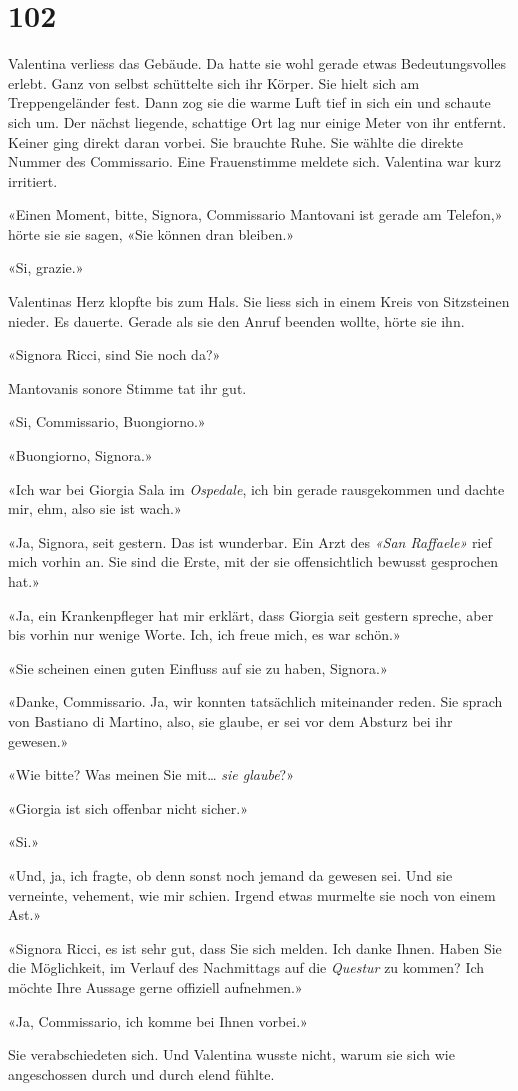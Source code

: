 \chapter{102}



Valentina verliess das Gebäude.
Da hatte sie wohl gerade etwas Bedeutungsvolles erlebt. Ganz von selbst
schüttelte sich ihr Körper. Sie hielt sich am Treppengeländer fest.
Dann zog sie die warme Luft tief in sich ein und schaute sich um. Der nächst liegende, schattige Ort 
lag nur einige Meter von ihr entfernt. Keiner ging direkt daran vorbei. Sie brauchte Ruhe.
Sie wählte die direkte Nummer des Commissario.
Eine Frauenstimme meldete sich. Valentina war kurz irritiert.

«Einen Moment, bitte, Signora, Commissario Mantovani ist gerade am
Telefon,» hörte sie sie sagen, «Sie können dran bleiben.»

«Si, grazie.»

Valentinas Herz klopfte bis zum Hals. Sie liess sich in einem Kreis von
Sitzsteinen nieder. Es dauerte.
Gerade als sie den Anruf beenden wollte, hörte sie ihn.

«Signora Ricci, sind Sie noch da?»

Mantovanis sonore Stimme tat ihr gut.

«Si, Commissario, Buongiorno.»

«Buongiorno, Signora.»

«Ich war bei Giorgia Sala im \emph{Ospedale}, ich bin gerade
rausgekommen und dachte mir, ehm, also sie ist wach.»

«Ja, Signora, seit gestern. Das ist wunderbar. Ein Arzt des \emph{«San
Raffaele»} rief mich vorhin an. Sie sind die Erste, mit der sie
offensichtlich bewusst gesprochen hat.»

«Ja, ein Krankenpfleger hat mir erklärt, dass Giorgia seit gestern
spreche, aber bis vorhin nur wenige Worte. Ich, ich freue mich, es war
schön.»

«Sie scheinen einen guten Einfluss auf sie zu haben, Signora.»

«Danke, Commissario. Ja, wir konnten tatsächlich miteinander reden. Sie
sprach von Bastiano di Martino, also, sie glaube, er sei vor dem Absturz
bei ihr gewesen.»

«Wie bitte? Was meinen Sie mit… \emph{sie glaube}?»

«Giorgia ist sich offenbar nicht sicher.»

«Si.»

«Und, ja, ich fragte, ob denn sonst noch jemand da gewesen sei. Und sie
verneinte, vehement, wie mir schien. Irgend etwas murmelte sie noch von
einem Ast.»

«Signora Ricci, es ist sehr gut, dass Sie sich melden. Ich danke Ihnen.
Haben Sie die Möglichkeit, im Verlauf des Nachmittags auf die \emph{Questur} zu
kommen? Ich möchte Ihre Aussage gerne offiziell aufnehmen.»

«Ja, Commissario, ich komme bei Ihnen vorbei.»

Sie verabschiedeten sich. Und Valentina wusste nicht, warum sie
sich wie angeschossen durch und durch elend fühlte.
